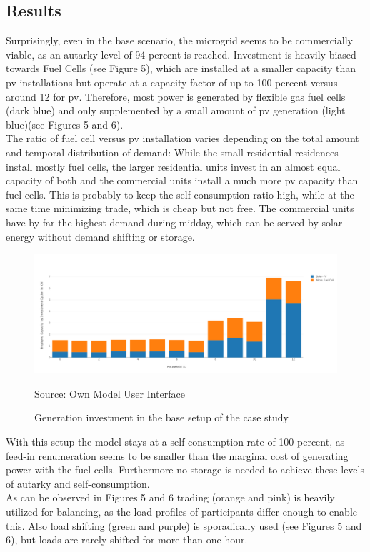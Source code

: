 \documentclass[
	11pt,								%
	DIV10,								%
	a4paper,         					%
	oneside,							%
	headheight=20pt,					%
	footheight=20pt,					%
    parskip=full,						%
    listof=totoc,						%
	bibliography=totoc,					%
	index=totoc,						%
]{scrartcl}
\begin{document}
\subsection{Results}
Surprisingly, even in the base scenario, the microgrid seems to be commercially viable, as an autarky level of 94 percent is reached. Investment is heavily biased towards Fuel Cells (see Figure 5), which are installed at a smaller capacity than pv installations but operate at a capacity factor of up to 100 percent versus around 12 for pv. Therefore, most power is generated by flexible gas fuel cells (dark blue) and only supplemented by a small amount of pv generation (light blue)(see Figures 5 and 6).\\
The ratio of fuel cell versus pv installation varies depending on the total amount and temporal distribution of demand: While the small residential residences install mostly fuel cells, the larger residential units invest in an almost equal capacity of both and the commercial units install a much more pv capacity than fuel cells. This is probably to keep the self-consumption ratio high, while at the same time minimizing trade, which is cheap but not free. The commercial units have by far the highest demand during midday, which can be served by solar energy without demand shifting or storage.
\begin{figure}[H]
	\centering
	\includegraphics[width=1\textwidth]{pictures/INV_GEN_Base.png}
	\caption{Generation investment in the base setup of the case study}
	\label{gen_investment_base}
	\flushleft\quad\quad\footnotesize{Source: Own Model User Interface}
\end{figure}
With this setup the model stays at a self-consumption rate of 100 percent, as feed-in renumeration seems to be smaller than the marginal cost of generating power with the fuel cells. Furthermore no storage is needed to achieve these levels of autarky and self-consumption. \\
As can be observed in Figures 5 and 6 trading (orange and pink) is heavily utilized for balancing, as the load profiles of participants differ enough to enable this. Also load shifting (green and purple) is sporadically used (see Figures 5 and 6), but loads are rarely shifted for more than one hour.
\end{document}
